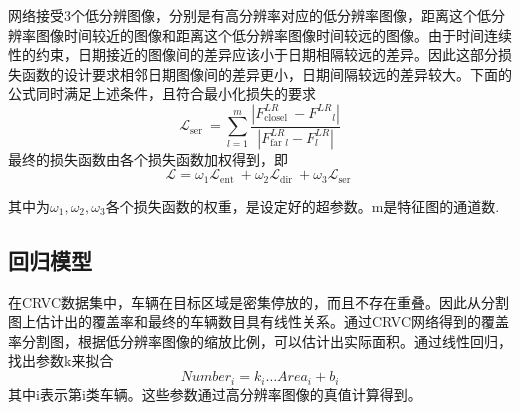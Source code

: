 网络接受3个低分辨图像，分别是有高分辨率对应的低分辨率图像，距离这个低分辨率图像时间较近的图像和距离这个低分辨率图像时间较远的图像。由于时间连续性的约束，日期接近的图像间的差异应该小于日期相隔较远的差异。因此这部分损失函数的设计要求相邻日期图像间的差异更小，日期间隔较远的差异较大。下面的公式同时满足上述条件，且符合最小化损失的要求
\begin{equation}
    \mathcal{L}_{\text {ser }}=\sum_{l=1}^{m} \frac{\left|F_{\text {closel }}^{L R}-F^{L R}{ }_{l}\right|}{\left|F_{\text {far } l}^{L R}-F^{L R}_ l\right|}
\end{equation}
最终的损失函数由各个损失函数加权得到，即
\begin{equation}
    \mathcal{L}=\omega_1\mathcal{L}_{\text {ent }}+\omega_2\mathcal{L}_{\text {dir }}+\omega_3\mathcal{L}_{\text {ser }}
\end{equation}

其中为$\omega_1,\omega_2,\omega_3$各个损失函数的权重，是设定好的超参数。m是特征图的通道数.

\subsection{回归模型}

在CRVC数据集中，车辆在目标区域是密集停放的，而且不存在重叠。因此从分割图上估计出的覆盖率和最终的车辆数目具有线性关系。通过CRVC网络得到的覆盖率分割图，根据低分辨率图像的缩放比例，可以估计出实际面积。通过线性回归，找出参数k来拟合
\begin{equation}
    Number_i=k_i\dots Area_i+b_i
\end{equation}
其中i表示第i类车辆。这些参数通过高分辨率图像的真值计算得到。
